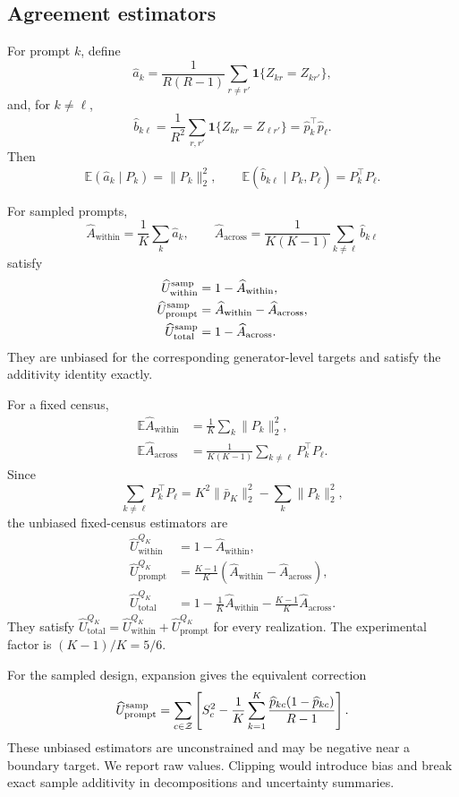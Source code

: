 \documentclass[letterpaper]{article}
\newcommand{\cZ}{\mathcal Z}
\newcommand{\E}{\mathbb E}
\newcommand{\1}{\mathbf 1}
\newcommand{\Up}{U_{\mathrm{prompt}}}
\newcommand{\Uw}{U_{\mathrm{within}}}
\newcommand{\Ut}{U_{\mathrm{total}}}
\newcommand{\Aw}{\widehat A_{\mathrm{within}}}
\newcommand{\Aa}{\widehat A_{\mathrm{across}}}
\begin{document}
\subsection{Agreement estimators}

For prompt $k$, define
\begin{equation}
\widehat a_k=\frac{1}{R(R-1)}
\sum_{r\ne r'}\1\{Z_{kr}=Z_{kr'}\},
\end{equation}
and, for $k\ne\ell$,
\begin{equation}
\widehat b_{k\ell}=\frac1{R^2}
\sum_{r,r'}\1\{Z_{kr}=Z_{\ell r'}\}
=\widehat p_k^\top\widehat p_\ell.
\end{equation}
Then
\[
\E(\widehat a_k\mid P_k)=\|P_k\|_2^2,\qquad
\E(\widehat b_{k\ell}\mid P_k,P_\ell)=P_k^\top P_\ell.
\]

For sampled prompts,
\[
\Aw=\frac1K\sum_k\widehat a_k,\qquad
\Aa=\frac1{K(K-1)}\sum_{k\ne\ell}\widehat b_{k\ell}
\]
satisfy
\begin{align}
\widehat\Uw^{\rm samp}&=1-\Aw,\\
\widehat\Up^{\rm samp}&=\Aw-\Aa,\\
\widehat\Ut^{\rm samp}&=1-\Aa.
\end{align}
They are unbiased for the corresponding generator-level targets and satisfy
the additivity identity exactly.

For a fixed census,
\begin{align}
\E\Aw&=\frac1K\sum_k\|P_k\|_2^2,\\
\E\Aa&=\frac1{K(K-1)}
\sum_{k\ne\ell}P_k^\top P_\ell.
\end{align}
Since
\[
\sum_{k\ne\ell}P_k^\top P_\ell
=K^2\|\bar p_K\|_2^2-\sum_k\|P_k\|_2^2,
\]
the unbiased fixed-census estimators are
\begin{align}
\widehat\Uw^{Q_K}&=1-\Aw,\\
\widehat\Up^{Q_K}&=\frac{K-1}{K}(\Aw-\Aa),\\
\widehat\Ut^{Q_K}
&=1-\frac1K\Aw-\frac{K-1}{K}\Aa.
\label{eq:s-census-estimators}
\end{align}
They satisfy
$\widehat\Ut^{Q_K}=\widehat\Uw^{Q_K}+\widehat\Up^{Q_K}$ for every
realization. The experimental factor is $(K-1)/K=5/6$.

For the sampled design, expansion gives the equivalent correction
\begin{equation}
\widehat\Up^{\rm samp}
=\sum_{c\in\cZ}\left[
S_c^2-\frac1K\sum_{k=1}^K
\frac{\widehat p_{kc}(1-\widehat p_{kc})}{R-1}
\right].
\label{eq:s-variance-correction}
\end{equation}
These unbiased estimators are unconstrained and may be negative near a boundary
target. We report raw values. Clipping would introduce bias and break exact
sample additivity in decompositions and uncertainty summaries.
\end{document}

